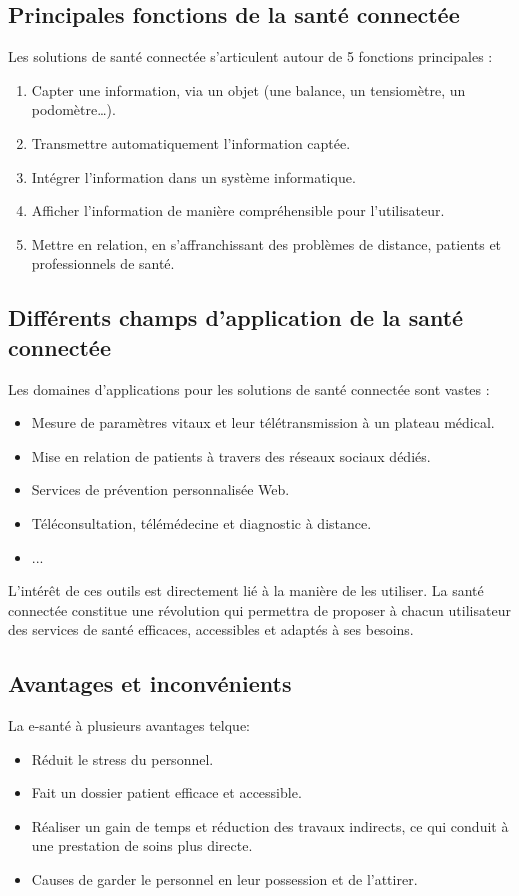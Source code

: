 \documentclass[12pt]{article}
\begin{document}
\subsection{Principales fonctions de la santé connectée}
Les solutions de santé connectée s’articulent autour de 5 fonctions principales :
\begin{enumerate}
	\item Capter une information, via un objet (une balance, un tensiomètre, un podomètre…).
	\item Transmettre automatiquement l’information captée.
	\item Intégrer l’information dans un système informatique.
	\item Afficher l’information de manière compréhensible pour l’utilisateur.
	\item Mettre en relation, en s’affranchissant des problèmes de distance, patients et professionnels de santé.
\end{enumerate}

\subsection{Différents champs d’application de la santé connectée}
Les domaines d’applications pour les solutions de santé connectée sont vastes :
\begin{itemize}
	\item Mesure de paramètres vitaux et leur télétransmission à un plateau médical.
	\item Mise en relation de patients à travers des réseaux sociaux dédiés.
	\item Services de prévention personnalisée Web.
	\item Téléconsultation, télémédecine et diagnostic à distance.
	\item ...\\
\end{itemize}

L’intérêt de ces outils est directement lié à la manière de les utiliser. La santé connectée constitue une révolution qui permettra de proposer à chacun utilisateur des services de santé efficaces, accessibles et adaptés à ses besoins.

\subsection{Avantages et inconvénients}
La e-santé à plusieurs avantages telque:
\begin{itemize}
	\item Réduit le stress du personnel.
	\item Fait un dossier patient efficace et accessible.
	\item Réaliser un gain de temps et réduction des travaux indirects, ce qui conduit à une prestation de soins plus directe.
	\item Causes de garder le personnel en leur possession et de l'attirer.
\end{itemize}
\end{document}
